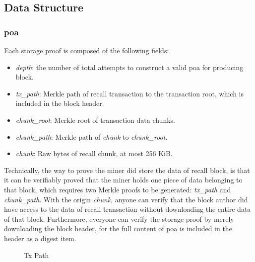 \documentclass[]{article}
\begin{document}
\subsection{Data Structure}

\subsubsection{poa}\label{poa}

Each storage proof is composed of the following fields:

\begin{itemize}
    \item \textit{depth}: the number of total attempts to construct a valid poa for producing block.
    \item \textit{tx\_path}: Merkle path of recall transaction to the transaction root, which is included in the block header.
    \item \textit{chunk\_root}: Merkle root of transaction data chunks.
    \item \textit{chunk\_path}: Merkle path of \textit{chunk} to \textit{chunk\_root}.
    \item \textit{chunk}: Raw bytes of recall chunk, at most 256 KiB.
\end{itemize}

Technically, the way to prove the miner did store the data of recall block, is that it can be verifiably proved that the miner holds one piece of data belonging to that block, which requires two Merkle proofs to be generated: \textit{tx\_path} and \textit{chunk\_path}. With the origin \textit{chunk}, anyone can verify that the block author did have access to the data of recall transaction without downloading the entire data of that block. Furthermore, everyone can verify the storage proof by merely downloading the block header, for the full content of poa is included in the header as a digest item.

\begin{figure}
\caption{Tx Path}
\end{figure}
\end{document}
